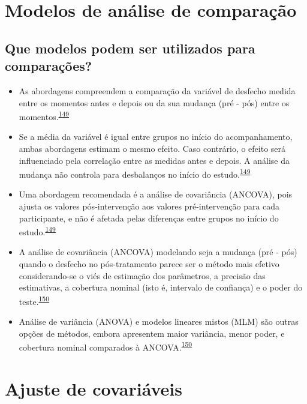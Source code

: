 \documentclass[
  a4paper,
]{book}
\begin{document}
\hypertarget{metodos-comparacao}{%
\section{Modelos de análise de comparação}\label{metodos-comparacao}}

\hypertarget{que-modelos-podem-ser-utilizados-para-comparauxe7uxf5es}{%
\subsection{Que modelos podem ser utilizados para comparações?}\label{que-modelos-podem-ser-utilizados-para-comparauxe7uxf5es}}

\begin{itemize}
\item
  As abordagens compreendem a comparação da variável de desfecho medida entre os momentos antes e depois ou da sua mudança (pré - pós) entre os momentos.\textsuperscript{\protect\hyperlink{ref-Vickers2001}{149}}
\item
  Se a média da variável é igual entre grupos no início do acompanhamento, ambas abordagens estimam o mesmo efeito. Caso contrário, o efeito será influenciado pela correlação entre as medidas antes e depois. A análise da mudança não controla para desbalanços no início do estudo.\textsuperscript{\protect\hyperlink{ref-Vickers2001}{149}}
\item
  Uma abordagem recomendada é a análise de covariância (ANCOVA), pois ajusta os valores pós-intervenção aos valores pré-intervenção para cada participante, e não é afetada pelas diferenças entre grupos no início do estudo.\textsuperscript{\protect\hyperlink{ref-Vickers2001}{149}}
\item
  A análise de covariância (ANCOVA) modelando seja a mudança (pré - pós) quando o desfecho no pós-tratamento parece ser o método mais efetivo considerando-se o viés de estimação dos parâmetros, a precisão das estimativas, a cobertura nominal (isto é, intervalo de confiança) e o poder do teste.\textsuperscript{\protect\hyperlink{ref-OConnell2017}{150}}
\item
  Análise de variância (ANOVA) e modelos lineares mistos (MLM) são outras opções de métodos, embora apresentem maior variância, menor poder, e cobertura nominal comparados à ANCOVA.\textsuperscript{\protect\hyperlink{ref-OConnell2017}{150}}
\end{itemize}

\hypertarget{ajuste-de-covariaveis}{%
\section{Ajuste de covariáveis}\label{ajuste-de-covariaveis}}
\end{document}

